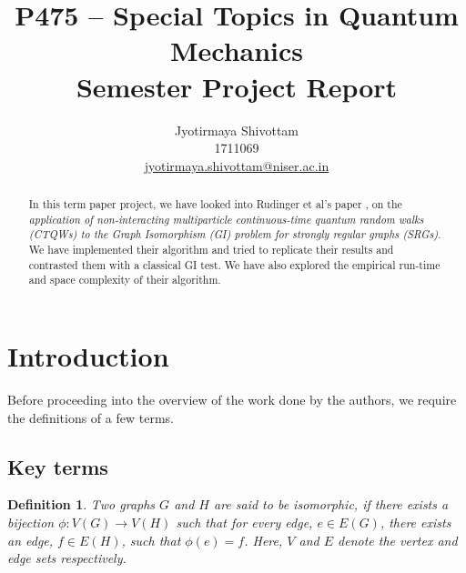 \documentclass[twocolumn,a4paper,english,10pt]{article}
\begin{document}
\setlength{\columnsep}{0.75cm}

\renewcommand\thesection{\Roman{section}.}
\renewcommand\thesubsection{\Roman{subsection}.}

\renewcommand\abstractnamefont{\normalfont\normalsize\bfseries}
\renewcommand\abstracttextfont{\normalfont\small}
\setlength{\absleftindent}{0pt}
\setlength{\absrightindent}{0pt}

\newtheorem{definition}{Definition}

\title{P475 -- Special Topics in Quantum Mechanics\\Semester Project Report}
\author{
    Jyotirmaya Shivottam\\
    1711069\\
    \small\href{mailto:jyotirmaya.shivottam@niser.ac.in}{jyotirmaya.shivottam@niser.ac.in}
}
\date{}

\maketitle

\begin{abstract}
    In this term paper project, we have looked into Rudinger et al's paper \cite{main}, on 
    the \textit{application of non-interacting multiparticle continuous-time quantum 
    random walks (CTQWs) to the Graph Isomorphism (GI) problem for strongly 
    regular graphs (SRGs)}. We have implemented their algorithm and tried to replicate 
    their results and contrasted them with a classical GI test. 
    We have also explored the empirical run-time and space complexity 
    of their algorithm.
\end{abstract}

\section{Introduction}
Before proceeding into the overview of the work done by the authors, we require the definitions of a few terms.

\subsection{Key terms}

\begin{definition}
    Two graphs $G$ and $H$ are said to be isomorphic, if there exists a bijection 
    $\phi: V(G) \rightarrow V(H)$ such that for every edge, $e \in E(G)$, there exists 
    an edge, $f \in E(H)$, such that $\phi(e) = f$. Here, $V$ and $E$ denote the vertex and 
    edge sets respectively.
\end{definition}
\end{document}
